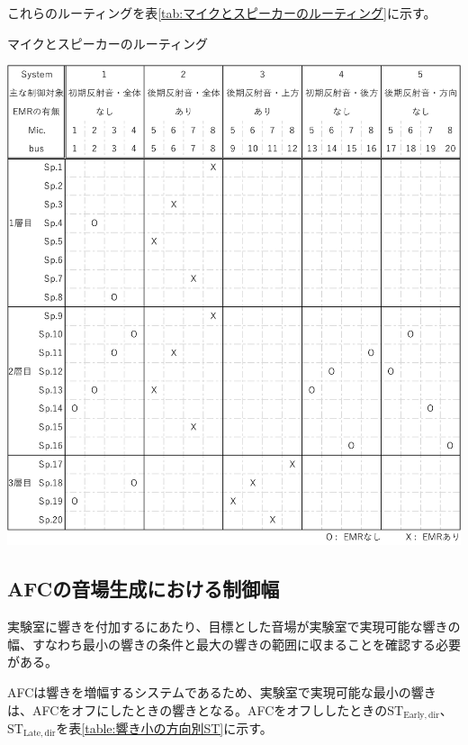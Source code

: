 \documentclass[11pt,a4j]{jreport}
\begin{document}
これらのルーティングを表\ref{tab:マイクとスピーカーのルーティング}に示す。

\newpage
{}
\begin{table}[H]
  \centering
  \caption{マイクとスピーカーのルーティング}
  \label{tab:マイクとスピーカーのルーティング}
  \includegraphics[width=1\linewidth]{images/experimentField/micSpRooting.pdf}
\end{table}


\newpage
\subsection*{AFCの音場生成における制御幅}
実験室に響きを付加するにあたり、目標とした音場が実験室で実現可能な響きの幅、すなわち最小の響きの条件と最大の響きの範囲に収まることを確認する必要がある。

AFCは響きを増幅するシステムであるため、実験室で実現可能な最小の響きは、AFCをオフにしたときの響きとなる。AFCをオフししたときの$\mathrm{ST_{Early,dir}}$、$\mathrm{ST_{Late,dir}}$を表\ref{table:響き小の方向別ST}に示す。
\end{document}
